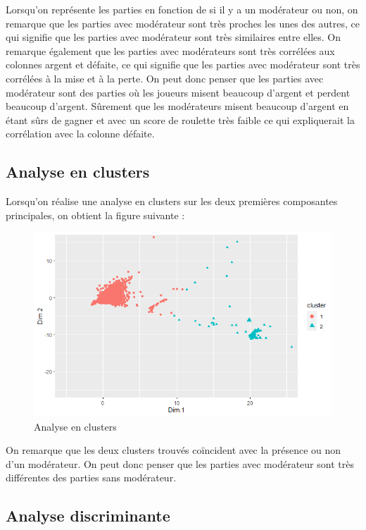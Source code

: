 \documentclass[a4paper, 12pt]{article}
\theoremstyle{exo}
\begin{document}
\noindent Lorsqu'on représente les parties en fonction de si il y a un modérateur ou non, on remarque que les parties avec modérateur sont très proches les unes des autres, ce qui signifie que les parties avec modérateur sont très similaires entre elles. On remarque également que les parties avec modérateurs sont très corrélées aux colonnes argent et défaite, ce qui signifie que les parties avec modérateur sont très corrélées à la mise et à la perte. On peut donc penser que les parties avec modérateur sont des parties où les joueurs misent beaucoup d'argent et perdent beaucoup d'argent. Sûrement que les modérateurs misent beaucoup d'argent en étant sûrs de gagner et avec un score de roulette très faible ce qui expliquerait la corrélation avec la colonne défaite.

\subsection{Analyse en clusters}

Lorsqu'on réalise une analyse en clusters sur les deux premières composantes principales, on obtient la figure suivante :

\begin{figure}[H]
\centering
\includegraphics[width=\textwidth]{figures/Cluster.png}
\caption{Analyse en clusters}
\end{figure}

\noindent On remarque que les deux clusters trouvés coïncident avec la présence ou non d'un modérateur. On peut donc penser que les parties avec modérateur sont très différentes des parties sans modérateur. 

\subsection{Analyse discriminante}
\end{document}
